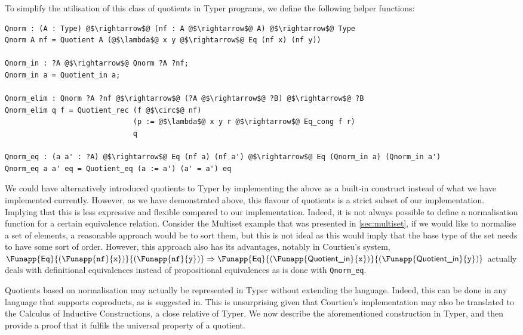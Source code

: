 \documentclass[12pt,twoside,maitrise]{dms}
\theoremstyle{definition}
\numberwithin{equation}{section}
\numberwithin{table}{chapter}
\numberwithin{figure}{chapter}
\newcommand\kw[1] {\textsf{#1}}
\newcommand\id[1] {\texttt{#1}}
\newcommand\fn[1] {\texttt{#1}}
\begin{document}
To simplify the utilisation of this class of quotients in Typer programs, we define the following helper functions:

\begin{verbatim}
Qnorm : (A : Type) @$\rightarrow$@ (nf : A @$\rightarrow$@ A) @$\rightarrow$@ Type
Qnorm A nf = Quotient A (@$\lambda$@ x y @$\rightarrow$@ Eq (nf x) (nf y))

Qnorm_in : ?A @$\rightarrow$@ Qnorm ?A ?nf;
Qnorm_in a = Quotient_in a;

Qnorm_elim : Qnorm ?A ?nf @$\rightarrow$@ (?A @$\rightarrow$@ ?B) @$\rightarrow$@ ?B
Qnorm_elim q f = Quotient_rec (f @$\circ$@ nf)
                              (p := @$\lambda$@ x y r @$\rightarrow$@ Eq_cong f r)
                              q

Qnorm_eq : (a a' : ?A) @$\rightarrow$@ Eq (nf a) (nf a') @$\rightarrow$@ Eq (Qnorm_in a) (Qnorm_in a')
Qnorm_eq a a' eq = Quotient_eq (a := a') (a' = a') eq
\end{verbatim}

We could have alternatively introduced quotients to Typer by implementing the
above as a built-in construct instead of what we have implemented currently.
However, as we have demonstrated above, this flavour of quotients is a strict
subset of our implementation. Implying that this is less expressive and flexible
compared to our implementation. Indeed, it is not always possible to define a
normalisation function for a certain equivalence relation. Consider the Multiset
example that was presented in \autoref{sec:multiset}, if we would like to
normalise a set of elements, a reasonable approach would be to sort them, but
this is not ideal as this would imply that the base type of the set needs to
have some sort of order. However, this approach also has its advantages, notably
in Courtieu's system\cite{courtieu-normalizedtypes},
$\Funapp{\kw{Eq}}{(\Funapp{\id{nf}}{\id{x}})}{(\Funapp{\id{nf}}{\id{y}})}
\Rightarrow
\Funapp{\kw{Eq}}{(\Funapp{\kw{Quotient\_in}}{\id{x}})}{(\Funapp{\kw{Quotient\_in}}{\id{y}})}$
actually deals with definitional equivalences instead of propositional
equivalences as is done with \fn{Qnorm\_eq}.

Quotients based on normalisation may actually be represented in Typer without
extending the language. Indeed, this can be done in any language that supports
coproducts, as is suggested in\cite{HoTTbook}. This is unsurprising given that
Courtieu's implementation may also be translated to the Calculus of Inductive
Constructions\cite{werner-cic}, a close relative of Typer. We now describe the
aforementioned construction in Typer, and then provide a proof that it fulfils
the universal property of a quotient.
\end{document}
